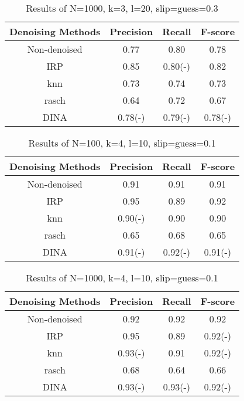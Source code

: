 \documentclass[11pt]{article}
\begin{document}
\begin{table}[!h]
\begin{center}
\begin{tabular}{|c|c|c|c|}
\hline
Denoising Methods & Precision & Recall & F-score\\
\hline
Non-denoised & 0.77 & 0.80 & 0.78  \\
\hline
IRP & 0.85 & 0.80(-) & 0.82 \\
\hline
knn & 0.73 & 0.74 & 0.73 \\
\hline
rasch & 0.64 & 0.72 & 0.67 \\
\hline
DINA & 0.78(-) & 0.79(-) & 0.78(-) \\
\hline
\end{tabular}
\end{center}
\caption{Results of N=1000, k=3, l=20, slip=guess=0.3}\label{tab:results12}
\end{table}


\begin{table}[!h]
\begin{center}
\begin{tabular}{|c|c|c|c|}
\hline
Denoising Methods & Precision & Recall & F-score\\
\hline
Non-denoised & 0.91 & 0.91 & 0.91  \\
\hline
IRP & 0.95 & 0.89 & 0.92 \\
\hline
knn & 0.90(-) & 0.90 & 0.90 \\
\hline
rasch & 0.65 & 0.68 & 0.65 \\
\hline
DINA & 0.91(-) & 0.92(-) & 0.91(-) \\
\hline
\end{tabular}
\end{center}
\caption{Results of N=100, k=4, l=10, slip=guess=0.1}\label{tab:results13}
\end{table}


\begin{table}[!h]
\begin{center}
\begin{tabular}{|c|c|c|c|}
\hline
Denoising Methods & Precision & Recall & F-score\\
\hline
Non-denoised & 0.92 & 0.92 & 0.92  \\
\hline
IRP & 0.95 & 0.89 & 0.92(-) \\
\hline
knn & 0.93(-) & 0.91 & 0.92(-) \\
\hline
rasch & 0.68 & 0.64 & 0.66 \\
\hline
DINA & 0.93(-) & 0.93(-) & 0.92(-) \\
\hline
\end{tabular}
\end{center}
\caption{Results of N=1000, k=4, l=10, slip=guess=0.1}\label{tab:results14}
\end{table}
\end{document}
